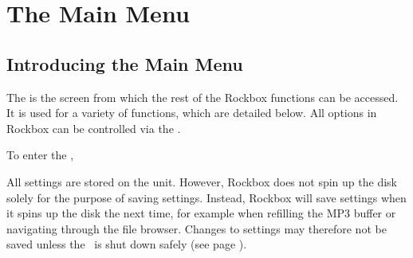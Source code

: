 \chapter{The Main Menu}

\section{Introducing the Main Menu}
The  is the screen from which the rest of the Rockbox functions can be 
accessed. It is used for a variety of functions, which are detailed below. 
All options in Rockbox can be controlled via the .

To enter the , 

All settings are stored on the unit. However, Rockbox does not spin up 
the disk solely for the purpose of saving settings.  Instead, Rockbox will
save settings when it spins up the disk the next time, for example when 
refilling the MP3 buffer or navigating through the file browser. Changes to 
settings may therefore not be saved unless the \dap\ is shut down safely 
(see page \pageref{ref:Safeshutdown}).

